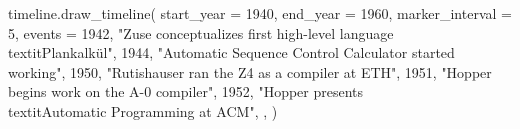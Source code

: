 \pagebreak
\begin{luacode}
timeline.draw_timeline({ 
    start_year = 1940,
    end_year = 1960,
    marker_interval = 5,
    events = {
        {1942, "Zuse conceptualizes first high-level language \\textit{Plankalkül}"},
        {1944, "Automatic Sequence Control Calculator started working"},
        {1950, "Rutishauser ran the Z4 as a compiler at ETH"},
        {1951, "Hopper begins work on the A-0 compiler"},
        {1952, "Hopper presents \\textit{Automatic Programming} at ACM"},
    },
})
\end{luacode}

